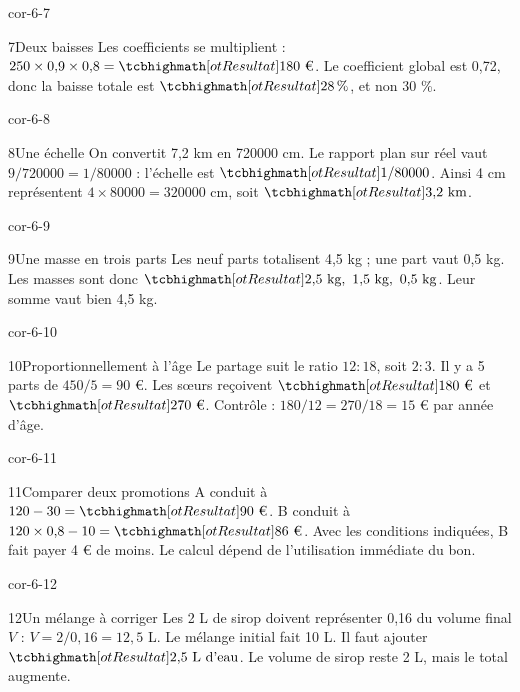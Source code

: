 \begin{blocLivre}{cor-6-7}\begin{corrige}{7}{Deux baisses}
Les coefficients se multiplient : $250\times0{,}9\times0{,}8=\res{180\text{ €}}$. Le coefficient global est 0,72, donc la baisse totale est $\res{28\,\%}$, et non 30 \%.
\end{corrige}\end{blocLivre}
\begin{blocLivre}{cor-6-8}\begin{corrige}{8}{Une échelle}
On convertit 7,2 km en 720000 cm. Le rapport plan sur réel vaut $9/720000=1/80000$ : l’échelle est $\res{1/80000}$. Ainsi 4 cm représentent $4\times80000=320000$ cm, soit $\res{3{,}2\text{ km}}$.
\end{corrige}\end{blocLivre}
\begin{blocLivre}{cor-6-9}\begin{corrige}{9}{Une masse en trois parts}
Les neuf parts totalisent 4,5 kg ; une part vaut 0,5 kg. Les masses sont donc $\res{2{,}5\text{ kg},\ 1{,}5\text{ kg},\ 0{,}5\text{ kg}}$. Leur somme vaut bien 4,5 kg.
\end{corrige}\end{blocLivre}
\begin{blocLivre}{cor-6-10}\begin{corrige}{10}{Proportionnellement à l’âge}
Le partage suit le ratio $12:18$, soit $2:3$. Il y a 5 parts de $450/5=90$ €. Les sœurs reçoivent $\res{180\text{ €}}$ et $\res{270\text{ €}}$. Contrôle : $180/12=270/18=15$ € par année d’âge.
\end{corrige}\end{blocLivre}
\begin{blocLivre}{cor-6-11}\begin{corrige}{11}{Comparer deux promotions}
A conduit à $120-30=\res{90\text{ €}}$. B conduit à $120\times0{,}8-10=\res{86\text{ €}}$. Avec les conditions indiquées, B fait payer 4 € de moins. Le calcul dépend de l’utilisation immédiate du bon.
\end{corrige}\end{blocLivre}
\begin{blocLivre}{cor-6-12}\begin{corrige}{12}{Un mélange à corriger}
Les 2 L de sirop doivent représenter 0,16 du volume final $V$ : $V=2/0{,}16=12{,}5$ L. Le mélange initial fait 10 L. Il faut ajouter $\res{2{,}5\text{ L d’eau}}$. Le volume de sirop reste 2 L, mais le total augmente.
\end{corrige}\end{blocLivre}
